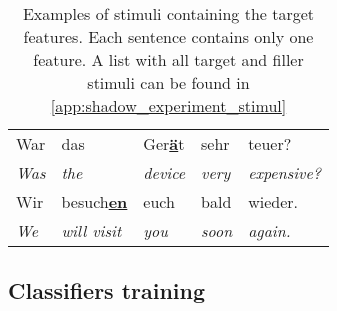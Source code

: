 %
\begin{table}[t]
	\centering
	\begin{tabularx}{\linewidth}{@{}*{5}{l}}
		\toprule
		
		War          	& das          			& Ger\textbf{\underline{ä}}t	& sehr          	& teuer? \\
		\emph{Was} 		& \emph{the} 			& \emph{device}           		& \emph{very} 		& \emph{expensive?} \\[0.3cm]
		
		
		Wir         	& besuch\textbf{\underline{en}} 						& euch				& bald          & wieder. \\
		\emph{We} 		& \emph{will visit}		& \emph{you} 					& \emph{soon} 		& \emph{again.} \\
		\bottomrule
	\end{tabularx}
	\caption[Example sentence for selected phonetic features]
		{Examples of stimuli containing the target features.
		 Each sentence contains only one feature.
		 A list with all target and filler stimuli can be found in \cref{app:shadow_experiment_stimul} }
	\label{tab:target_features}
\end{table}

\subsection{Classifiers training}
\label{subsec:classifiers_training}

